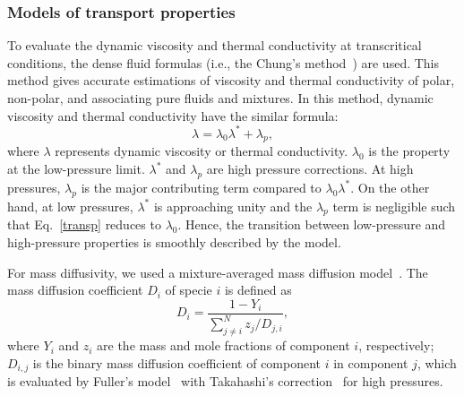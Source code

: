 \subsubsection{Models of transport properties}
To evaluate the dynamic viscosity and thermal conductivity at transcritical conditions, the dense fluid formulas (i.e., the Chung's method~\cite{chung1988generalized}) are used. This method gives accurate estimations of viscosity and thermal conductivity of polar, non-polar, and associating pure fluids and mixtures. In this method, dynamic viscosity and thermal conductivity have the similar formula:
\begin{equation}
\lambda=\lambda_0 \lambda^*+\lambda_p, \label{transp}
\end{equation}
where $\lambda$ represents dynamic viscosity or thermal conductivity. $\lambda_0$ is the property at the low-pressure limit. $\lambda^*$ and $\lambda_p$ are high pressure corrections. At high pressures, $\lambda_p$ is the major contributing term compared to $\lambda_0 \lambda^*$. On the other hand, at low pressures, $\lambda^*$ is approaching unity and the $\lambda_p$ term is negligible such that Eq.~\ref{transp} reduces to $\lambda_0$. Hence, the transition between low-pressure and high-pressure properties is smoothly described by the model. 

For mass diffusivity, we used a mixture-averaged mass diffusion model~\cite{kee1996chemkin}. The mass diffusion coefficient $D_i$ of specie $i$ is defined as
\begin{equation}
D_i=\frac{1-Y_i}{\sum^N_{j\neq i}z_j/D_{j,i}},\label{massdiff}
\end{equation}
where $Y_i$ and $z_i$ are the mass and mole fractions of component $i$, respectively; $D_{i,j}$ is the binary mass diffusion coefficient of component $i$ in component $j$, which is evaluated by Fuller’s model~\cite{fuller1966new} with Takahashi’s correction~\cite{takahashi1975preparation} for high pressures.


